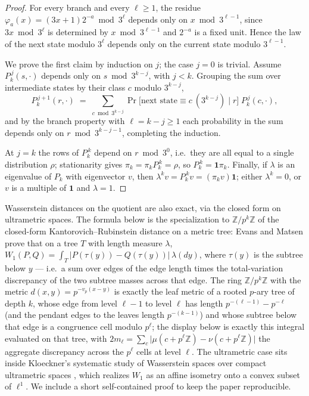 \documentclass[11pt]{amsart}
\theoremstyle{definition}
\theoremstyle{remark}
\newcommand{\Z}{\mathbb{Z}}
\begin{document}
\begin{proof}
For every branch and every $\ell \ge 1$, the residue $\varphi_a(x) = (3x+1)2^{-a} \bmod 3^\ell$ depends only on $x \bmod 3^{\ell-1}$, since $3x \bmod 3^\ell$ is determined by $x \bmod 3^{\ell-1}$ and $2^{-a}$ is a fixed unit. Hence the law of the next state modulo $3^\ell$ depends only on the current state modulo $3^{\ell-1}$.

We prove the first claim by induction on $j$; the case $j = 0$ is trivial. Assume $P_k^{\,j}(s,\cdot)$ depends only on $s \bmod 3^{k-j}$, with $j < k$. Grouping the sum over intermediate states by their class $c$ modulo $3^{k-j}$,
\[
P_k^{\,j+1}(r,\cdot) \;=\; \sum_{c \bmod 3^{k-j}} \Pr\bigl[\text{next state} \equiv c \ (3^{k-j}) \mid r\bigr]\; P_k^{\,j}(c,\cdot),
\]
and by the branch property with $\ell = k-j \ge 1$ each probability in the sum depends only on $r \bmod 3^{k-j-1}$, completing the induction.

At $j = k$ the rows of $P_k^{\,k}$ depend on $r \bmod 3^0$, i.e.\ they are all equal to a single distribution $\rho$; stationarity gives $\pi_k = \pi_k P_k^{\,k} = \rho$, so $P_k^{\,k} = \mathbf{1}\pi_k$. Finally, if $\lambda$ is an eigenvalue of $P_k$ with eigenvector $v$, then $\lambda^k v = P_k^{\,k} v = (\pi_k v)\mathbf{1}$; either $\lambda^k = 0$, or $v$ is a multiple of $\mathbf{1}$ and $\lambda = 1$.
\end{proof}

Wasserstein distances on the quotient are also exact, via the closed form on ultrametric spaces. The formula below is the specialization to $\Z/p^k\Z$ of the closed-form Kantorovich--Rubinstein distance on a metric tree: Evans and Matsen \cite[eq.~(5)]{evansmatsen2012} prove that on a tree $T$ with length measure $\lambda$, $W_1(P,Q) = \int_T \lvert P(\tau(y)) - Q(\tau(y))\rvert\, \lambda(dy)$, where $\tau(y)$ is the subtree below $y$ --- i.e.\ a sum over edges of the edge length times the total-variation discrepancy of the two subtree masses across that edge. The ring $\Z/p^k\Z$ with the metric $d(x,y)=p^{-v_p(x-y)}$ is exactly the leaf metric of a rooted $p$-ary tree of depth $k$, whose edge from level $\ell-1$ to level $\ell$ has length $p^{-(\ell-1)} - p^{-\ell}$ (and the pendant edges to the leaves length $p^{-(k-1)}$) and whose subtree below that edge is a congruence cell modulo $p^\ell$; the display below is exactly this integral evaluated on that tree, with $2m_\ell = \sum_{c}\lvert\mu(c+p^\ell\Z)-\nu(c+p^\ell\Z)\rvert$ the aggregate discrepancy across the $p^{\ell}$ cells at level $\ell$. The ultrametric case sits inside Kloeckner's systematic study of Wasserstein spaces over compact ultrametric spaces \cite{kloeckner2015}, which realizes $W_1$ as an affine isometry onto a convex subset of $\ell^1$. We include a short self-contained proof to keep the paper reproducible.
\end{document}

